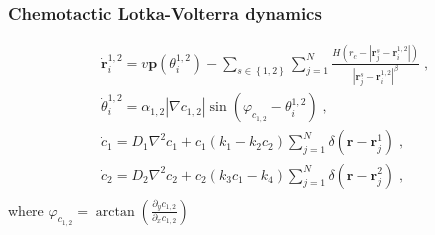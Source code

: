 \documentclass{article}
\begin{document}
\subsubsection{Chemotactic Lotka-Volterra dynamics}
\begin{subequations}
    \begin{align}
        &\mathbf{\dot{r}}_{i}^{1,2}=v\mathbf{p}\left( \theta _{i}^{1,2} \right) -\sum_{s\in \left\{ 1,2 \right\}}{\sum_{j=1}^N{\frac{H\left( r_c-\left| \mathbf{r}_{j}^{s}-\mathbf{r}_{i}^{1,2} \right| \right)}{\left| \mathbf{r}_{j}^{s}-\mathbf{r}_{i}^{1,2} \right|^{\beta}}}}\;,\\
        &\dot{\theta}_{i}^{1,2}=\alpha _{1,2}\left| \nabla c_{1,2} \right|\sin \left( \varphi _{c_{1,2}}-\theta _{i}^{1,2} \right) \;,\\
        &\dot{c}_1=D_1\nabla ^2c_1+c_1\left( k_1-k_2c_2 \right) \sum_{j=1}^N{\delta \left( \mathbf{r}-\mathbf{r}_{j}^{1} \right)}\;,\\
        &\dot{c}_2=D_2\nabla ^2c_2+c_2\left( k_3c_1-k_4 \right) \sum_{j=1}^N{\delta \left( \mathbf{r}-\mathbf{r}_{j}^{2} \right)}\;,\\
    \end{align}
\end{subequations}
where $\varphi _{c_{1,2}}=\arctan \left( \frac{\partial _yc_{1,2}}{\partial _xc_{1,2}} \right) $
\end{document}
